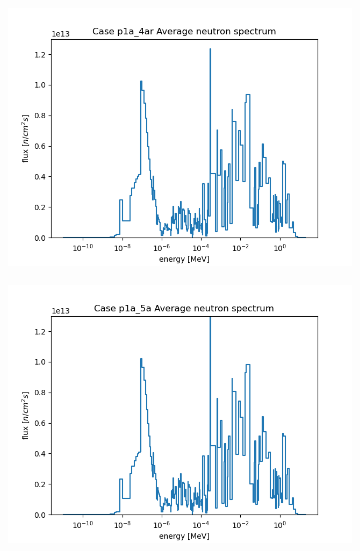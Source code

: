 \documentclass[letterpaper,11pt]{report}
\begin{document}
\begin{figure}[H]
\begin{subfigure}{.32\textwidth}
                \centering
                \includegraphics[width=\linewidth]{../../phase1a/case4ar/analysis_output/p1a_4ar_f.png}
                \caption{}
              \end{subfigure}
              \begin{subfigure}{.33\textwidth}
                \centering
                \includegraphics[width=\linewidth]{../../phase1a/case5a/analysis_output/p1a_5a_f.png}
                \caption{}
              \end{subfigure}
              \begin{subfigure}{.33\textwidth}
                \centering

\end{subfigure}
\end{figure}
\end{document}
